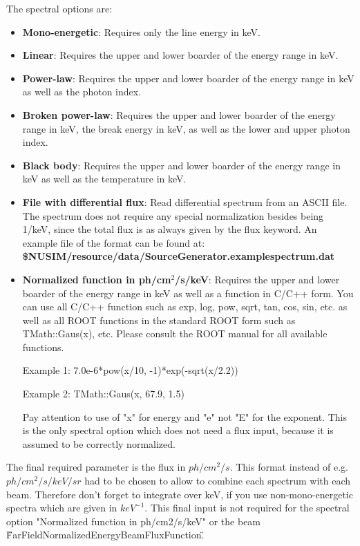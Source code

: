 The spectral options are:
\begin{itemize} 
\item \textbf{Mono-energetic}: Requires only the line energy in keV.
\item \textbf{Linear}: Requires the upper and lower boarder of the energy range in keV.
\item \textbf{Power-law}: Requires the upper and lower boarder of the energy range in keV as well as the photon index.
\item \textbf{Broken power-law}: Requires the upper and lower boarder of the energy range in keV, the break energy in keV, as well as the lower and upper photon index.
\item \textbf{Black body}: Requires the upper and lower boarder of the energy range in keV as well as the temperature in keV.
\item \textbf{File with differential flux}: Read differential spectrum from an ASCII file. The spectrum does not require any special normalization besides being 1/keV, since the total flux is as always given by the flux keyword. An example file of the format can be found at:\\
\textbf{\${NUSIM}/resource/data/SourceGenerator.examplespectrum.dat}
\item \textbf{Normalized function in ph/cm$^2$/s/keV}: Requires the upper and lower boarder of the energy range in keV as well as a function in C/C++ form.  You can use all C/C++ function such as exp, log, pow, sqrt, tan, cos, sin, etc. as well as all ROOT functions in the standard ROOT form such as TMath::Gaus(x), etc. Please consult the ROOT manual for all available functions.

Example 1: 7.0e-6*pow(x/10, -1)*exp(-sqrt(x/2.2))

Example 2: TMath::Gaus(x, 67.9, 1.5)

Pay attention to use of "x" for energy and "e" not "E" for the exponent. This is the only spectral option which does not need a flux input, because it is assumed to be correctly normalized.
\end{itemize}

The final required parameter is the flux in $ph/cm^2/s$. This format instead of e.g. $ph/cm^2/s/keV/sr$ had to be chosen to allow to combine each spectrum with each beam. Therefore don't forget to integrate over keV, if you use non-mono-energetic spectra which are given in $keV^{-1}$. This final input is not required for the spectral option "Normalized function in ph/cm2/s/keV" or the beam \"FarFieldNormalizedEnergyBeamFluxFunction\".


